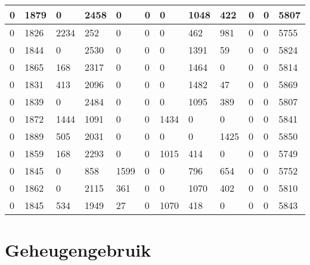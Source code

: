 \begin{longtable}{ | l | l | l | l | l | l | l | l | l | l | l || l | }
	0 & 1879 & 0 & 2458 & 0 & 0 & 0 & 1048 & 422 & 0 & 0 & 5807 \\ \hline
	0 & 1826 & 2234 & 252 & 0 & 0 & 0 & 462 & 981 & 0 & 0 & 5755   \\ \hline
	0 & 1844 & 0 & 2530 & 0 & 0 & 0 & 1391 & 59 & 0 & 0 & 5824    \\ \hline
	0 & 1865 & 168 & 2317 & 0 & 0 & 0 & 1464 & 0 & 0 & 0 & 5814  \\ \hline
	0 & 1831 & 413 & 2096 & 0 & 0 & 0 & 1482 & 47 & 0 & 0 & 5869    \\ \hline
	0 & 1839 & 0 & 2484 & 0 & 0 & 0 & 1095 & 389 & 0 & 0 & 5807   \\ \hline
	0 & 1872 & 1444 & 1091 & 0 & 0 & 1434 & 0 & 0 & 0 & 0 & 5841 \\\hline
	0 & 1889 & 505 & 2031 & 0 & 0 & 0 & 0 & 1425 & 0 & 0 & 5850    \\ \hline
	0 & 1859 & 168 & 2293 & 0 & 0 & 1015 & 414 & 0 & 0 & 0 & 5749  \\ \hline
	0 & 1845 & 0 & 858 & 1599 & 0 & 0 & 796 & 654 & 0 & 0 & 5752   \\ \hline
	0 & 1862 & 0 & 2115 & 361 & 0 & 0 & 1070 & 402 & 0 & 0 & 5810   \\ \hline
	0 & 1845 & 534 & 1949 & 27 & 0 & 1070 & 418 & 0 & 0 & 0 & 5843   \\ \hline



\end{longtable}


\section{ Geheugengebruik}
\label{dataset:geheugengebruik}

